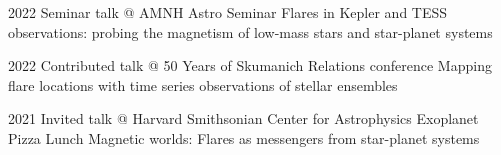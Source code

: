 \documentclass[11pt]{k-cv} %
\begin{document}
\begin{entrylist}
\entry
{2022}
{Seminar talk @ AMNH Astro Seminar}
{}%
{Flares in Kepler and TESS observations: 
probing the magnetism of low-mass stars and star-planet systems}

\entry
{2022}
{Contributed talk @ 50 Years of Skumanich Relations conference}
{}%
{Mapping flare locations with time series observations of stellar ensembles}

\entry
{2021}
{Invited talk @ Harvard Smithsonian Center for Astrophysics Exoplanet Pizza Lunch}
{}%
{Magnetic worlds: Flares as messengers from star-planet systems}


\end{entrylist}
\end{document}

